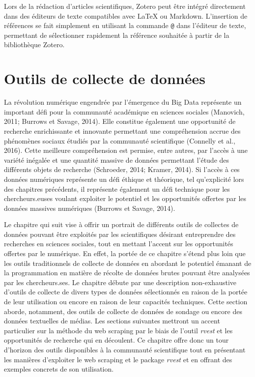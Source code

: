 \documentclass[
  letterpaper,
  DIV=11,
  numbers=noendperiod]{scrreprt}
\begin{document}
Lors de la rédaction d'articles scientifiques, Zotero peut être intégré
directement dans des éditeurs de texte compatibles avec LaTeX ou
Markdown. L'insertion de références se fait simplement en utilisant la
commande \texttt{@} dans l'éditeur de texte, permettant de sélectionner
rapidement la référence souhaitée à partir de la bibliothèque Zotero.


\hypertarget{sec-chap5}{%
\chapter{Outils de collecte de données}\label{sec-chap5}}

La révolution numérique engendrée par l'émergence du Big Data représente
un important défi pour la communauté académique en sciences sociales
(Manovich, 2011; Burrows et Savage, 2014). Elle constitue également une
opportunité de recherche enrichissante et innovante permettant une
compréhension accrue des phénomènes sociaux étudiés par la communauté
scientifique (Connelly et al., 2016). Cette meilleure compréhension est
permise, entre autres, par l'accès à une variété inégalée et une
quantité massive de données permettant l'étude des différents objets de
recherche (Schroeder, 2014; Kramer, 2014). Si l'accès à ces données
numériques représente un défi éthique et théorique, tel qu'explicité
lors des chapitres précédents, il représente également un défi technique
pour les chercheurs.euses voulant exploiter le potentiel et les
opportunités offertes par les données massives numériques (Burrows et
Savage, 2014).

Le chapitre qui suit vise à offrir un portrait de différents outils de
collectes de données pouvant être exploités par les scientifiques
désirant entreprendre des recherches en sciences sociales, tout en
mettant l'accent sur les opportunités offertes par le numérique. En
effet, la portée de ce chapitre s'étend plus loin que les outils
traditionnels de collecte de données en abordant le potentiel émanant de
la programmation en matière de récolte de données brutes pouvant être
analysées par les chercheurs.ses. Le chapitre débute par une description
non-exhaustive d'outils de collecte de divers types de données
sélectionnés en raison de la portée de leur utilisation ou encore en
raison de leur capacités techniques. Cette section aborde, notamment,
des outils de collecte de données de sondage ou encore des données
textuelles de médias. Les sections suivantes mettront un accent
particulier sur la méthode du web scraping par le biais de l'outil
\emph{rvest} et les opportunités de recherche qui en découlent. Ce
chapitre offre donc un tour d'horizon des outils disponibles à la
communauté scientifique tout en présentant les manières d'exploiter le
web scraping et le package \emph{rvest} et en offrant des exemples
concrets de son utilisation.
\end{document}
